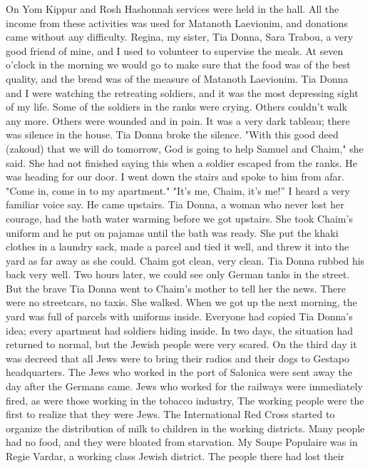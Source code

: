 On Yom Kippur and Rosh Hashonnah services were held in the hall.
All the income from these activities was used for Matanoth Laevionim, and donations came without 
any difficulty.
Regina, my sister, Tia Donna, Sara Trabou, a very good 
friend of mine, and I used to volunteer to supervise the meals.
At seven o'clock in the morning we would go to make sure that the food was of the best quality, and the bread was of the measure of Matanoth Laevionim. 
Tia Donna and I were watching the retreating soldiers, and it was the most depressing sight of my life. Some of the soldiers in the ranks were crying.
Others couldn't walk any more. Others were wounded and in pain.
It was a very dark tableau; there was silence in the house. Tia Donna broke the silence. 
"With this good deed (zakoud) that we will do tomorrow, God is going to help Samuel and Chaim," she said.
She had not finished saying this when a soldier escaped from the ranks.
He was heading for our door.
I went down the stairs and spoke to him from afar. 
"Come in, come in to my apartment." 
"It's me, Chaim, it's me!” I  heard a very familiar voice say.
He came upstairs.
Tia Donna, a woman who never lost her courage, had the 
bath water warming before we got upstairs.
She took Chaim's uniform and he put on pajamas until the bath was ready.
She put the khaki clothes in a laundry sack, made a parcel and tied it well, and threw it into the yard as far away as she could.
Chaim got clean, very clean. 
Tia Donna rubbed his back very well. 
Two hours later, we could see only German tanks in the street.
But the brave Tia Donna went to Chaim's mother to tell her the news.
There were no streetcars, no taxis.
She walked. 
When we got up the next morning, the yard was full of parcels with uniforms inside.
Everyone had copied Tia Donna's idea; every apartment 
had soldiers hiding inside. 
In two days, the situation had returned to normal, but the Jewish people were very scared.
On the third day it was decreed that all Jews were to bring their radios and their dogs to Gestapo headquarters.
The Jews who worked in the port of Salonica were sent away the day after the Germans came.
Jews who worked for the railways were immediately 
fired, as were those working in the tobacco industry, The working people 
were the first to realize that they were Jews. 
The International Red Cross started to organize the distribution of 
milk to children in the working districts. Many people had no food, and 
they were bloated from starvation. My Soupe Populaire was in Regie Vardar, a working class Jewish district. The people there had lost their 
